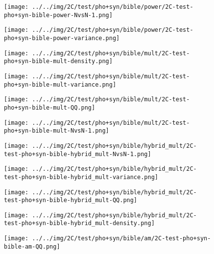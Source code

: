\begin{figure}[H]
\centering	\texttt{[image: ../../img/2C/test/pho+syn/bible/power/2C-test-pho+syn-bible-power-NvsN-1.png]}
\end{figure}
\begin{figure}[H]
\centering	\texttt{[image: ../../img/2C/test/pho+syn/bible/power/2C-test-pho+syn-bible-power-variance.png]}
\end{figure}
\begin{figure}[H]
\centering	\texttt{[image: ../../img/2C/test/pho+syn/bible/mult/2C-test-pho+syn-bible-mult-density.png]}
\end{figure}
\begin{figure}[H]
\centering	\texttt{[image: ../../img/2C/test/pho+syn/bible/mult/2C-test-pho+syn-bible-mult-variance.png]}
\end{figure}
\begin{figure}[H]
\centering	\texttt{[image: ../../img/2C/test/pho+syn/bible/mult/2C-test-pho+syn-bible-mult-QQ.png]}
\end{figure}
\begin{figure}[H]
\centering	\texttt{[image: ../../img/2C/test/pho+syn/bible/mult/2C-test-pho+syn-bible-mult-NvsN-1.png]}
\end{figure}
\begin{figure}[H]
\centering	\texttt{[image: ../../img/2C/test/pho+syn/bible/hybrid\_mult/2C-test-pho+syn-bible-hybrid\_mult-NvsN-1.png]}
\end{figure}
\begin{figure}[H]
\centering	\texttt{[image: ../../img/2C/test/pho+syn/bible/hybrid\_mult/2C-test-pho+syn-bible-hybrid\_mult-variance.png]}
\end{figure}
\begin{figure}[H]
\centering	\texttt{[image: ../../img/2C/test/pho+syn/bible/hybrid\_mult/2C-test-pho+syn-bible-hybrid\_mult-QQ.png]}
\end{figure}
\begin{figure}[H]
\centering	\texttt{[image: ../../img/2C/test/pho+syn/bible/hybrid\_mult/2C-test-pho+syn-bible-hybrid\_mult-density.png]}
\end{figure}
\begin{figure}[H]
\centering	\texttt{[image: ../../img/2C/test/pho+syn/bible/am/2C-test-pho+syn-bible-am-QQ.png]}
\end{figure}
